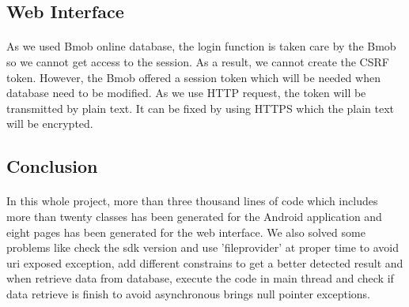 \subsection{Web Interface}
\paragraph{} As we used Bmob online database, the login function is taken care by the Bmob so we cannot get access to the session. As a result, we cannot create the CSRF token. However, the Bmob offered a session token which will be needed when database need to be modified. As we use HTTP request, the token will be transmitted by plain text. It can be fixed by using HTTPS which the plain text will be encrypted. 
\subsection{Conclusion}
\paragraph{} 
In this whole project, more than three thousand lines of code which includes more than twenty classes has been generated for the Android application and eight pages has been generated for the web interface. We also solved some problems like check the sdk version and use 'fileprovider' at proper time to avoid uri exposed exception, add different constrains to get a better detected result and when retrieve data from database, execute the code in main thread and check if data retrieve is finish to avoid asynchronous brings null pointer exceptions.   